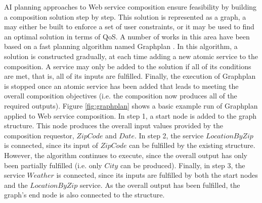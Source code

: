 AI planning approaches to Web service composition ensure feasibility by building a composition solution step by step. This solution is represented as a graph, a may either be built to enforce a set of user constraints, or it may be used to find an optimal solution in terms of QoS. A number of works in this area \cite{feng2013dynamic,wang2013genetic,xia2013web,wang2014automated} have been based on a fast planning algorithm named Graphplan \cite{blum1997fast}. In this algorithm, a solution is constructed gradually, at each time adding a new atomic service to the composition. A service may only be added to the solution if all of its conditions are met, that is, all of its inputs are fulfilled. Finally, the execution of Graphplan is stopped once an atomic service has been added that leads to meeting the overall composition objectives (i.e. the composition now produces all of the required outputs). Figure \ref{fig:graphplan} shows a basic example run of Graphplan applied to Web service composition. In step 1, a start node is added to the graph structure. This node produces the overall input values provided by the composition requestor, $ZipCode$ and $Date$. In step 2, the service $LocationByZip$ is connected, since its input of $ZipCode$ can be fulfilled by the existing structure. However, the algorithm continues to execute, since the overall output has only been partially fulfilled (i.e. only $City$ can be produced). Finally, in step 3, the service $Weather$ is connected, since its inputs are fulfilled by both the start nodes and the $LocationByZip$ service. As the overall output has been fulfilled, the graph's end node is also connected to the structure.

